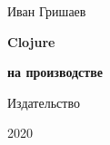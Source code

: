 
\begin{titlepage}

\begin{center}

  {Иван Гришаев}

  \vspace*{5cm}

  {\Huge\textbf{Clojure}}

  \vspace{1mm}

  {\Large\textbf{на производстве}}

  \vspace*{\fill}

  \ifx\publisher\empty
  \else
  {Издательство \publisher}
  \fi

  {2020}

\end{center}

\end{titlepage}

